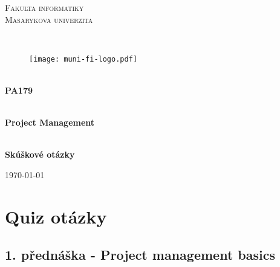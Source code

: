 \documentclass[11pt,a4paper]{article}
\begin{document}

\begin{titlepage}

    \begin{center}
        \vfill {%
            \Huge{%
                \textsc{%
                    Fakulta informatiky\\[3mm]%
                    Masarykova univerzita%
                }%
            }%
        }%

        \hfill\\[15mm]

        \begin{figure}[!h]
            \centering
            \texttt{[image: muni-fi-logo.pdf]}
        \end{figure}

        \hfill\\[10mm]

        \Huge{
            \textbf{
                PA179
            }
        }

        \hfill\\[-10mm]

        \huge{
            \textbf{
                Project Management
            }
        }

        \hfill\\[10mm]

        \LARGE{
            \textbf{
                Skúškové otázky
            }
        }
        \vfill

        \Large{
            \today
        }

    \end{center}
\end{titlepage}

\setlength{\parskip}{0pt}
    \hypersetup{hidelinks}\tableofcontents
\setlength{\parskip}{0pt}

\newpage


\section{Quiz otázky}


    \subsection{1. přednáška - Project management basics \cite{pres-1}}
\end{document}
